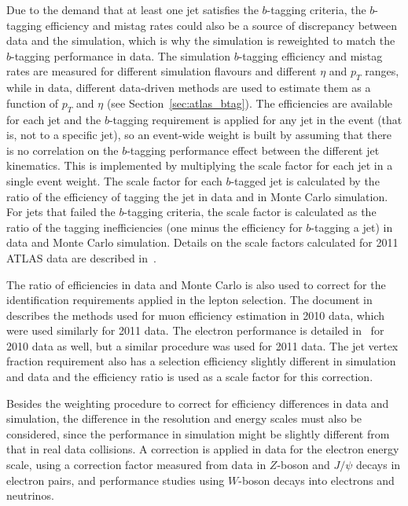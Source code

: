 Due to the demand that at least one jet satisfies the $b$-tagging criteria,
the $b$-tagging efficiency and mistag rates could also be a source of discrepancy between data and the simulation, which is why the simulation is reweighted to
match the $b$-tagging performance in data. The simulation $b$-tagging efficiency and mistag rates are measured for different simulation flavours and different $\eta$ and $p_T$
ranges, while in data, different data-driven methods are used to estimate them as a function of $p_T$ and $\eta$ (see Section~\ref{sec:atlas_btag}).
The efficiencies are available for each jet and the
$b$-tagging requirement is applied for any jet in the event (that is, not to a specific jet), so an event-wide
weight is built by assuming that there is no correlation on the $b$-tagging performance effect between the different jet kinematics. This is implemented by multiplying
the scale factor for each jet in a single event weight. The scale factor for each $b$-tagged jet is calculated by the ratio of the efficiency of tagging the jet in
data and in Monte Carlo simulation. For jets that failed the $b$-tagging criteria, the scale factor is calculated as the ratio of the tagging inefficiencies
(one minus the efficiency for $b$-tagging a jet) in data and Monte Carlo simulation. Details on the scale factors calculated for 2011 ATLAS data are described in~\cite{btag2011}.

The ratio of efficiencies in data and Monte Carlo is also used to correct for the identification
requirements applied in the lepton selection. The document in~\cite{muonperf2010} describes the methods used for muon efficiency estimation in 2010 data, which
were used similarly for 2011 data. The electron performance is detailed in~\cite{electron2010} for 2010 data as well, but a similar procedure was used for 2011 data.
The jet vertex fraction requirement also has a selection efficiency slightly different in simulation and data and
the efficiency ratio is used as a scale factor for this correction.

Besides the weighting procedure to correct for efficiency differences in data and simulation, the difference in the resolution and energy scales must also be considered,
since the performance in simulation might be slightly different from that in real data collisions. A correction is applied in data for the electron energy scale, using a correction
factor measured from data in $Z$-boson and $J/\psi$ decays in electron pairs, and performance studies using $W$-boson decays into electrons and neutrinos.

